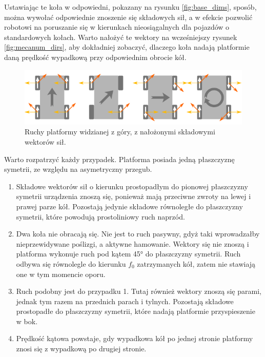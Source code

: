 		Ustawiając te koła w odpowiedni, pokazany na rysunku \ref{fig:base_dims}, sposób, można wywołać odpowiednie znoszenie się składowych sił,
		a w efekcie pozwolić robotowi na poruszanie się w kierunkach nieosiągalnych dla pojazdów o standardowych kołach.
		Warto nałożyć te wektory na wcześniejszy rysunek \ref{fig:mecanum_dirs}, aby dokładniej zobaczyć, 
		dlaczego koła nadają platformie daną prędkość wypadkową przy odpowiednim obrocie kół.

		\begin{figure}[H]
		\centering
		\includegraphics[width=\textwidth]{graphics/mecanum_dirs_vect.pdf}
		\caption{Ruchy platformy widzianej z góry, z nałożonymi składowymi wektorów sił.}
		\label{fig:mecanum_dirs_vect}
		\end{figure} 

		Warto rozpatrzyć każdy przypadek. Platforma posiada jedną płaszczyznę symetrii, ze względu na asymetryczny przegub.
		\begin{enumerate}
			\item Składowe wektorów sił o kierunku prostopadłym do pionowej płaszczyzny symetrii urządzenia znoszą się, ponieważ mają przeciwne zwroty na lewej i prawej parze kół.
			Pozostają jedynie składowe równoległe do płaszczyzny symetrii, które powodują prostoliniowy ruch naprzód.
			\item Dwa koła nie obracają się. Nie jest to ruch pasywny, gdyż taki wprowadzałby nieprzewidywane poślizgi, a aktywne hamowanie.
			Wektory się nie znoszą i platforma wykonuje ruch pod kątem 45° do płaszczyzny symetrii. Ruch odbywa się równolegle do kierunku $f_0$ zatrzymanych kół,
			zatem nie stawiają one w tym momencie oporu.
			\item Ruch podobny jest do przypadku 1. Tutaj również wektory znoszą się parami, jednak tym razem na przednich parach i tylnych. 
			Pozostają składowe prostopadłe do płaszczyzny symetrii, które nadają platformie przyspieszenie w bok.
			\item Prędkość kątowa powstaje, gdy wypadkowa kół po jednej stronie platformy znosi się z wypadkową po drugiej stronie.
		\end{enumerate}


